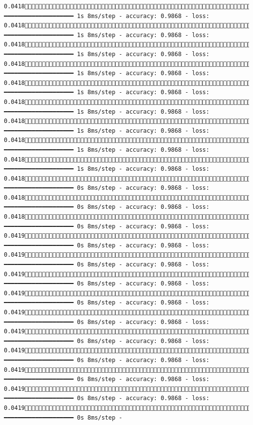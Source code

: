 \documentclass[
  letterpaper,
  DIV=11,
  numbers=noendperiod]{scrreprt}
\begin{document}
\begin{verbatim}
0.04181697/1875 ━━━━━━━━━━━━━━━━━━━━ 1s 8ms/step - accuracy: 0.9868 - loss: 0.04181703/1875 ━━━━━━━━━━━━━━━━━━━━ 1s 8ms/step - accuracy: 0.9868 - loss: 0.04181709/1875 ━━━━━━━━━━━━━━━━━━━━ 1s 8ms/step - accuracy: 0.9868 - loss: 0.04181714/1875 ━━━━━━━━━━━━━━━━━━━━ 1s 8ms/step - accuracy: 0.9868 - loss: 0.04181719/1875 ━━━━━━━━━━━━━━━━━━━━ 1s 8ms/step - accuracy: 0.9868 - loss: 0.04181724/1875 ━━━━━━━━━━━━━━━━━━━━ 1s 8ms/step - accuracy: 0.9868 - loss: 0.04181730/1875 ━━━━━━━━━━━━━━━━━━━━ 1s 8ms/step - accuracy: 0.9868 - loss: 0.04181736/1875 ━━━━━━━━━━━━━━━━━━━━ 1s 8ms/step - accuracy: 0.9868 - loss: 0.04181741/1875 ━━━━━━━━━━━━━━━━━━━━ 1s 8ms/step - accuracy: 0.9868 - loss: 0.04181747/1875 ━━━━━━━━━━━━━━━━━━━━ 0s 8ms/step - accuracy: 0.9868 - loss: 0.04181753/1875 ━━━━━━━━━━━━━━━━━━━━ 0s 8ms/step - accuracy: 0.9868 - loss: 0.04181758/1875 ━━━━━━━━━━━━━━━━━━━━ 0s 8ms/step - accuracy: 0.9868 - loss: 0.04191764/1875 ━━━━━━━━━━━━━━━━━━━━ 0s 8ms/step - accuracy: 0.9868 - loss: 0.04191771/1875 ━━━━━━━━━━━━━━━━━━━━ 0s 8ms/step - accuracy: 0.9868 - loss: 0.04191777/1875 ━━━━━━━━━━━━━━━━━━━━ 0s 8ms/step - accuracy: 0.9868 - loss: 0.04191783/1875 ━━━━━━━━━━━━━━━━━━━━ 0s 8ms/step - accuracy: 0.9868 - loss: 0.04191790/1875 ━━━━━━━━━━━━━━━━━━━━ 0s 8ms/step - accuracy: 0.9868 - loss: 0.04191796/1875 ━━━━━━━━━━━━━━━━━━━━ 0s 8ms/step - accuracy: 0.9868 - loss: 0.04191801/1875 ━━━━━━━━━━━━━━━━━━━━ 0s 8ms/step - accuracy: 0.9868 - loss: 0.04191807/1875 ━━━━━━━━━━━━━━━━━━━━ 0s 8ms/step - accuracy: 0.9868 - loss: 0.04191812/1875 ━━━━━━━━━━━━━━━━━━━━ 0s 8ms/step - accuracy: 0.9868 - loss: 0.04191818/1875 ━━━━━━━━━━━━━━━━━━━━ 0s 8ms/step - 
\end{verbatim}
\end{document}
